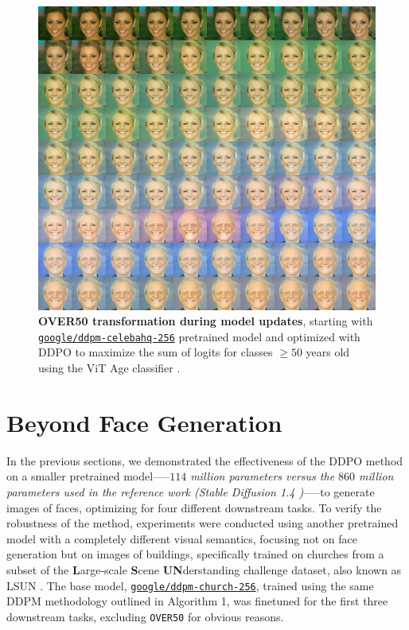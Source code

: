 \begin{figure}[ht]
  \centering
  \includegraphics[scale=2.80]{img/results/over50_47.png}
  \vspace{-0pt}  %
    \captionsetup{width=\textwidth} %
    \caption{\textbf{OVER50 transformation during model updates}, starting with \href{https://huggingface.co/google/ddpm-celebahq-256}{\texttt{\texttt{google/ddpm-celebahq-256}}}
    pretrained model and optimized with DDPO to maximize the sum of logits for classes $\geq 50$ years old using the ViT Age classifier \cite{vitage-classifier-hf}.}
    \label{fig:ddpm-to-ddpo-over50}
\end{figure}

\section{Beyond Face Generation} 

\noindent In the previous sections, we demonstrated the effectiveness of the DDPO method on a smaller pretrained model--—\textit{$114$ million parameters versus the $860$ million parameters used in the reference work (Stable Diffusion 1.4 \cite{black2023training})}--—to generate images of faces, optimizing for four different downstream tasks. To verify the robustness of the method, experiments were conducted using another pretrained model with a completely different visual semantics, focusing not on face generation but on images of buildings, specifically trained on churches from a subset of the \textbf{L}arge-scale \textbf{S}cene \textbf{UN}derstanding challenge dataset, also known as LSUN \cite{Wang_2017}. The base model, \href{https://huggingface.co/google/ddpm-church-256}{\texttt{\texttt{google/ddpm-church-256}}}, trained using the same DDPM methodology \cite{ho2020denoising} outlined in Algorithm 1, was finetuned for the first three downstream tasks, excluding \texttt{OVER50} for obvious reasons. \\

